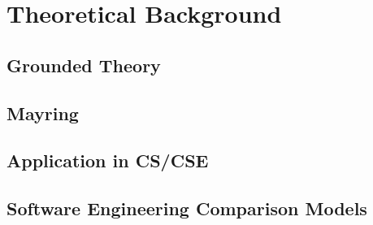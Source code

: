 \chapter{Theoretical Background} %
\label{cha:Theoretical Background}

\section{Grounded Theory} %
\label{sec:Grounded Theory}


\section{Mayring} %
\label{sec:Mayring}


\section{Application in CS/CSE} %
\label{sec:Application in CS/CSE}


\section{Software Engineering Comparison Models} %



